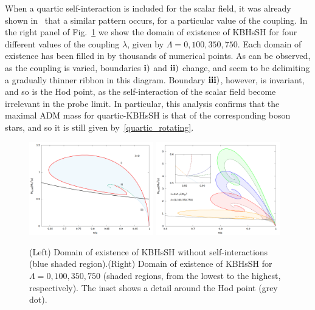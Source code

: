 When a quartic self-interaction is included for the scalar field, it was already shown in~\cite{Kleihaus:2015iea} that a similar pattern occurs, for a particular value of the coupling. In the right panel of Fig.~\ref{kbhsh1} we show the domain of existence of KBHsSH for four different values of the coupling $\lambda$, given by $\Lambda=0,100,350,750$. Each domain of existence has been filled in by thousands of numerical points. As can be observed, as the coupling is varied, boundaries  ${\bf i)}$ and ${\bf ii)}$ change, and seem to be delimiting a gradually thinner ribbon in this diagram. Boundary  ${\bf iii)}$, however, is invariant, and so is the Hod point, as the self-interaction of the scalar field become irrelevant in the probe limit. In particular, this analysis confirms that the maximal ADM mass for quartic-KBHsSH is that of the corresponding boson stars, and so it is still given by~\eqref{quartic_rotating}.




\begin{figure}[h!]
  \begin{center}
    \includegraphics[width=0.48\textwidth]{papers/selfInteractions/w-vs-M-0.png}
    \includegraphics[width=0.48\textwidth]{papers/selfInteractions/BH-w-Mtimes4.png}
      \end{center}
  \caption{(Left) Domain of existence of KBHsSH without self-interactions (blue shaded region).(Right) Domain of existence of KBHsSH for $\Lambda=0,100,350,750$ (shaded regions, from the lowest to the highest, respectively). The inset shows a detail around the Hod point (grey dot).}
  \label{kbhsh1}
\end{figure}


